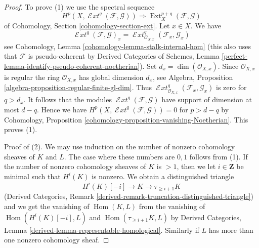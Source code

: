 \documentclass{stacks-project}
\theoremstyle{plain}
\theoremstyle{definition}
\theoremstyle{remark}
\numberwithin{equation}{subsection}
\def\Hom{\mathop{\mathrm{Hom}}\nolimits}
\def\Ext{\mathop{\mathrm{Ext}}\nolimits}
\def\SheafExt{\mathop{\mathcal{E}\!\mathit{xt}}\nolimits}
\begin{document}
\begin{proof}
To prove (1) we use the spectral sequence
$$
H^p(X, \SheafExt^q(\mathcal{F}, \mathcal{G})) \Rightarrow
\Ext^{p + q}_X(\mathcal{F}, \mathcal{G})
$$
of Cohomology, Section \ref{cohomology-section-ext}. Let $x \in X$.
We have
$$
\SheafExt^q(\mathcal{F}, \mathcal{G})_x =
\SheafExt^q_{\mathcal{O}_{X, x}}(\mathcal{F}_x, \mathcal{G}_x)
$$
see Cohomology, Lemma \ref{cohomology-lemma-stalk-internal-hom}
(this also uses that $\mathcal{F}$ is pseudo-coherent by
Derived Categories of Schemes, Lemma
\ref{perfect-lemma-identify-pseudo-coherent-noetherian}).
Set $d_x = \dim(\mathcal{O}_{X, x})$.
Since $\mathcal{O}_{X, x}$ is regular the ring
$\mathcal{O}_{X, x}$ has global dimension $d_x$, see
Algebra, Proposition \ref{algebra-proposition-regular-finite-gl-dim}.
Thus $\SheafExt^q_{\mathcal{O}_{X, x}}(\mathcal{F}_x, \mathcal{G}_x)$
is zero for $q > d_x$. It follows that the modules
$\SheafExt^q(\mathcal{F}, \mathcal{G})$ have support
of dimension at most $d - q$. Hence we have
$H^p(X, \SheafExt^q(\mathcal{F}, \mathcal{G})) = 0$ for $p > d - q$
by Cohomology, Proposition \ref{cohomology-proposition-vanishing-Noetherian}.
This proves (1).

\medskip\noindent
Proof of (2).
We may use induction on the number of nonzero cohomology sheaves
of $K$ and $L$. The case where these numbers are $0, 1$ follows
from (1). If the number of nonzero cohomology sheaves of $K$
is $> 1$, then we let $i \in \mathbf{Z}$ be minimal such that
$H^i(K)$ is nonzero. We obtain a distinguished triangle
$$
H^i(K)[-i] \to K \to \tau_{\geq i + 1}K
$$
(Derived Categories, Remark
\ref{derived-remark-truncation-distinguished-triangle})
and we get the vanishing of $\Hom(K, L)$ from the vanishing
of $\Hom(H^i(K)[-i], L)$ and $\Hom(\tau_{\geq i + 1}K, L)$
by Derived Categories, Lemma \ref{derived-lemma-representable-homological}.
Similarly if $L$ has more than one nonzero cohomology sheaf.
\end{proof}
\end{document}

